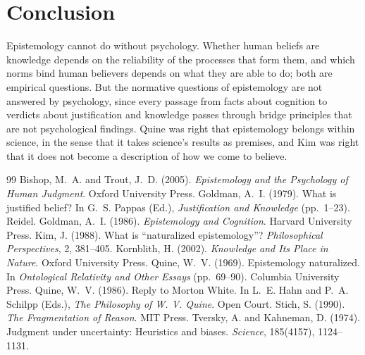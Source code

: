 \documentclass{situationist-preprint}
\begin{document}
\section{Conclusion}

Epistemology cannot do without psychology. Whether human beliefs are knowledge depends on the reliability of the processes that form them, and which norms bind human believers depends on what they are able to do; both are empirical questions. But the normative questions of epistemology are not answered by psychology, since every passage from facts about cognition to verdicts about justification and knowledge passes through bridge principles that are not psychological findings. Quine was right that epistemology belongs within science, in the sense that it takes science's results as premises, and Kim was right that it does not become a description of how we come to believe.

\begin{thebibliography}{99}\small
{} Bishop, M.~A. and Trout, J.~D. (2005). \emph{Epistemology and the Psychology of Human Judgment}. Oxford University Press.
 Goldman, A.~I. (1979). What is justified belief? In G.~S. Pappas (Ed.), \emph{Justification and Knowledge} (pp.~1--23). Reidel.
 Goldman, A.~I. (1986). \emph{Epistemology and Cognition}. Harvard University Press.
 Kim, J. (1988). What is \enquote{naturalized epistemology}? \emph{Philosophical Perspectives}, 2, 381--405.
 Kornblith, H. (2002). \emph{Knowledge and Its Place in Nature}. Oxford University Press.
 Quine, W.~V. (1969). Epistemology naturalized. In \emph{Ontological Relativity and Other Essays} (pp.~69--90). Columbia University Press.
 Quine, W.~V. (1986). Reply to Morton White. In L.~E. Hahn and P.~A. Schilpp (Eds.), \emph{The Philosophy of W. V. Quine}. Open Court.
 Stich, S. (1990). \emph{The Fragmentation of Reason}. MIT Press.
 Tversky, A. and Kahneman, D. (1974). Judgment under uncertainty: Heuristics and biases. \emph{Science}, 185(4157), 1124--1131.
\end{thebibliography}
\end{document}
